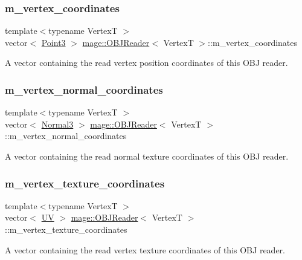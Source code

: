 \subsubsection{\texorpdfstring{m\+\_\+vertex\+\_\+coordinates}{m\_vertex\_coordinates}}
{\footnotesize\ttfamily template$<$typename VertexT $>$ \\
vector$<$ \hyperlink{structmage_1_1_point3}{Point3} $>$ \hyperlink{classmage_1_1_o_b_j_reader}{mage\+::\+O\+B\+J\+Reader}$<$ VertexT $>$\+::m\+\_\+vertex\+\_\+coordinates\hspace{0.3cm}{\ttfamily [private]}}

A vector containing the read vertex position coordinates of this O\+BJ reader. \hypertarget{classmage_1_1_o_b_j_reader_a765e87afe7bd138dadcfc8c194311ed3}{}\label{classmage_1_1_o_b_j_reader_a765e87afe7bd138dadcfc8c194311ed3} 
\subsubsection{\texorpdfstring{m\+\_\+vertex\+\_\+normal\+\_\+coordinates}{m\_vertex\_normal\_coordinates}}
{\footnotesize\ttfamily template$<$typename VertexT $>$ \\
vector$<$ \hyperlink{structmage_1_1_normal3}{Normal3} $>$ \hyperlink{classmage_1_1_o_b_j_reader}{mage\+::\+O\+B\+J\+Reader}$<$ VertexT $>$\+::m\+\_\+vertex\+\_\+normal\+\_\+coordinates\hspace{0.3cm}{\ttfamily [private]}}

A vector containing the read normal texture coordinates of this O\+BJ reader. \hypertarget{classmage_1_1_o_b_j_reader_aec7c093d380be0b8506f7b8fdf9c3ad1}{}\label{classmage_1_1_o_b_j_reader_aec7c093d380be0b8506f7b8fdf9c3ad1} 
\subsubsection{\texorpdfstring{m\+\_\+vertex\+\_\+texture\+\_\+coordinates}{m\_vertex\_texture\_coordinates}}
{\footnotesize\ttfamily template$<$typename VertexT $>$ \\
vector$<$ \hyperlink{structmage_1_1_u_v}{UV} $>$ \hyperlink{classmage_1_1_o_b_j_reader}{mage\+::\+O\+B\+J\+Reader}$<$ VertexT $>$\+::m\+\_\+vertex\+\_\+texture\+\_\+coordinates\hspace{0.3cm}{\ttfamily [private]}}

A vector containing the read vertex texture coordinates of this O\+BJ reader. 